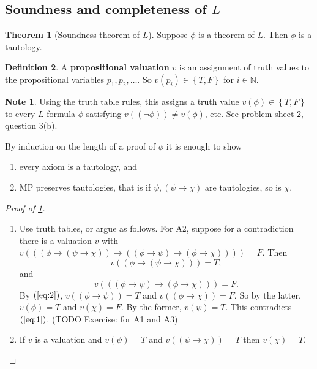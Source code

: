 \documentclass{article}
\newcommand{\N}{\mathbb{N}}
\newcommand{\rb}[1]{\left( #1 \right)}
\newcommand{\cb}[1]{\left\{ #1 \right\}}
\newcommand{\notb}[1]{\rb{\neg #1}}
\newcommand{\impb}[2]{\rb{#1 \rightarrow #2}}
\theoremstyle{definition}\newtheorem{definition}{Definition}[subsection]
\theoremstyle{definition}\newtheorem{remark}[definition]{Remark}
\theoremstyle{definition}\newtheorem*{example}{Example}
\theoremstyle{definition}\newtheorem*{note}{Note}
\newtheorem{theorem}[definition]{Theorem}
\begin{document}

\subsection{Soundness and completeness of $ L $}

\begin{theorem}[Soundness theorem of $ L $]
\label{thm:1.3.1}
Suppose $ \phi $ is a theorem of $ L $. Then $ \phi $ is a tautology.
\end{theorem}

\begin{definition}
A \textbf{propositional valuation} $ v $ is an assignment of truth values to the propositional variables $ p_1, p_2, \dots $. So $ v\rb{p_i} \in \cb{T, F} $ for $ i \in \N $.
\end{definition}

\begin{note}
Using the truth table rules, this assigns a truth value $ v\rb{\phi} \in \cb{T, F} $ to every $ L $-formula $ \phi $ satisfying $ v\rb{\notb{\phi}} \ne v\rb{\phi} $, etc. See problem sheet $ 2 $, question $ 3 $(b).
\end{note}

By induction on the length of a proof of $ \phi $ it is enough to show
\begin{enumerate}
\item every axiom is a tautology, and
\item MP preserves tautologies, that is if $ \psi, \impb{\psi}{\chi} $ are tautologies, so is $ \chi $.
\end{enumerate}

\begin{proof}[Proof of \ref{thm:1.3.1}]
\hfill
\begin{enumerate}
\item Use truth tables, or argue as follows. For A2, suppose for a contradiction there is a valuation $ v $ with $ v\rb{\impb{\impb{\phi}{\impb{\psi}{\chi}}}{\impb{\impb{\phi}{\psi}}{\impb{\phi}{\chi}}}} = F $. Then
\begin{equation}
\label{eq:1}
v\rb{\impb{\phi}{\impb{\psi}{\chi}}} = T,
\end{equation}
and
\begin{equation}
\label{eq:2}
v\rb{\impb{\impb{\phi}{\psi}}{\impb{\phi}{\chi}}} = F.
\end{equation}
By $ \rb{\ref{eq:2}} $, $ v\rb{\impb{\phi}{\psi}} = T $ and $ v\rb{\impb{\phi}{\chi}} = F $. So by the latter, $ v\rb{\phi} = T $ and $ v\rb{\chi} = F $. By the former, $ v\rb{\psi} = T $. This contradicts $ \rb{\ref{eq:1}} $. (TODO Exercise: for A1 and A3)
\item If $ v $ is a valuation and $ v\rb{\psi} = T $ and $ v\rb{\impb{\psi}{\chi}} = T $ then $ v\rb{\chi} = T $.
\end{enumerate}
\end{proof}
\end{document}
